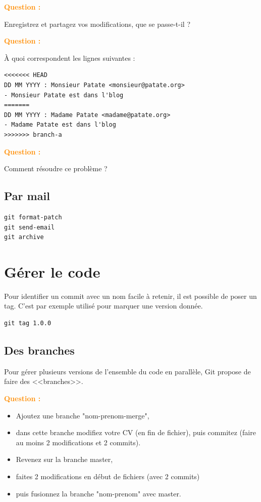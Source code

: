 \documentclass[a4paper]{article}
\newcounter{question}
\newcommand{\q}{
  \textcolor{DarkOrange}{\textbf{Question \thequestion : }}
  \addtocounter{question}{1}
  \newline
}
\begin{document}
\q Enregistrez et partagez vos modifications, que se passe-t-il ? 

\q À quoi correspondent les lignes suivantes : 
\begin{verbatim}
<<<<<<< HEAD
DD MM YYYY : Monsieur Patate <monsieur@patate.org>
- Monsieur Patate est dans l'blog
=======
DD MM YYYY : Madame Patate <madame@patate.org>
- Madame Patate est dans l'blog
>>>>>>> branch-a
\end{verbatim}

\q Comment résoudre ce problème ?

\subsection* {Par mail}

\begin{verbatim}
git format-patch
git send-email
git archive
\end{verbatim}

\section*{Gérer le code}

Pour identifier un commit avec un nom facile à retenir, il est possible de poser un tag. C'est par exemple utilisé pour marquer une version donnée.

\begin{verbatim}
git tag 1.0.0
\end{verbatim}

\subsection*{Des branches}

Pour gérer plusieurs versions de l'ensemble du code en parallèle, Git propose de faire des <<branches>>.

\q
\begin{itemize}
  \item Ajoutez une branche "nom-prenom-merge", 
  \item dans cette branche modifiez votre CV (en fin de fichier), puis commitez (faire au moins 2 modifications et 2 commits). 
  \item Revenez sur la branche master, 
  \item faites 2 modifications en début de fichiers (avec 2 commits) 
  \item puis fusionnez la branche "nom-prenom" avec master.
\end{itemize}
\end{document}

